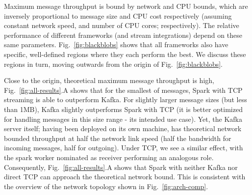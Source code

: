 \documentclass[letterpaper,conference]{IEEEtran}
\begin{document}


Maximum message throughput is bound by network and CPU bounds, which are inversely proportional to message size and CPU cost respectively (assuming constant network speed, and number of CPU cores; respectively). The relative performance of different frameworks (and stream integrations) depend on these same parameters. Fig.~\ref{fig:blackblobs} shows that all frameworks also have specific, well-defined regions where they each perform the best. We discuss these regions in turn, moving outwards from the origin of Fig.~\ref{fig:blackblobs}.

Close to the origin, theoretical maximum message throughput is high, Fig.~\ref{fig:all-results}.A shows that for the smallest of messages, Spark with TCP streaming is able to outperform Kafka. 
For slightly larger message sizes (but less than 1MB), Kafka slightly outperforms Spark with TCP (it is better optimized for handling messages in this size range - its intended use case). Yet, the Kafka server itself; having been deployed on its own machine, has theoretical network bounded throughput at half the network link speed (half the bandwidth for incoming messages, half for outgoing). Under TCP, we see a similar effect, with the spark worker nominated as receiver performing an analogous role. Consequently, Fig.~\ref{fig:all-results}.A shows that Spark with neither Kafka nor direct TCP can approach the theoretical network bound. This is consistent with the overview of the network topology shown in Fig.~\ref{fig:arch-comp}.
\end{document}
